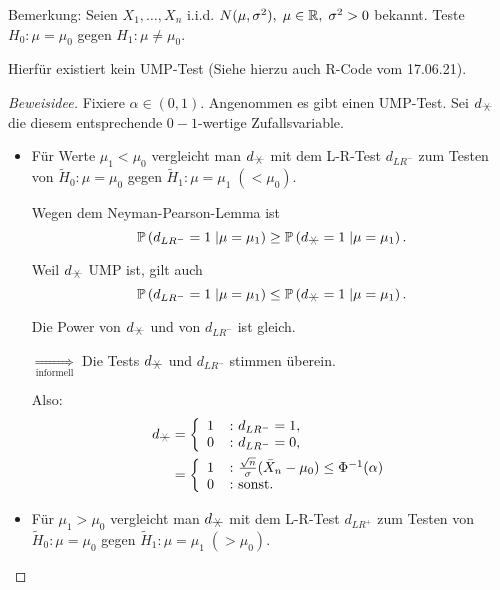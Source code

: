 \documentclass{tstextbook}
\begin{document}
\begin{remark}
	Bemerkung: Seien $ X_1,\ldots,X_n $ i.i.d. $ N(\mu,\sigma^2), \; \mu\in\mathbb R , \; \sigma^2>0 $ bekannt. Teste $ H_0\colon \mu=\mu_0 $ gegen $ H_1\colon \mu\ne\mu_0 $.
	
	Hierfür existiert kein UMP-Test (Siehe hierzu auch R-Code vom 17.06.21).
\end{remark}

\begin{proof}[Beweisidee]
	Fixiere $ \alpha\in(0,1) $. Angenommen es gibt einen UMP-Test. Sei $ d_{\hexstar} $ die diesem entsprechende $ 0-1 $-wertige Zufallsvariable.
	
	\begin{itemize}
		\item Für Werte $ \mu_1<\mu_0 $ vergleicht man $ d_{\hexstar} $ mit dem L-R-Test $ d_{LR^-} $ zum Testen von $ \tilde{H}_0\colon \mu=\mu_0 $ gegen $ \tilde{H}_1\colon \mu=\mu_1 \;(<\mu_0) $. 
		
		Wegen dem Neyman-Pearson-Lemma ist 
		\[
		\Prob\left(d_{LR^-}=1\; |\mu=\mu_1\right) \ge \Prob\left(d_{\hexstar}=1\; |\mu=\mu_1\right).
		\]
		
		Weil $ d_{\hexstar} $ UMP ist, gilt auch 
		\[
		\Prob\left(d_{LR^-}=1\; |\mu=\mu_1\right) \le \Prob\left(d_{\hexstar}=1\; |\mu=\mu_1\right).
		\]
		
		Die Power von $ d_{\hexstar} $ und von $ d_{LR^-} $ ist gleich. 
		
		$ \underset{\text{informell}}{\Rightarrow} $ Die Tests $ d_{\hexstar} $ und $ d_{LR^-} $ stimmen überein.
		
		Also: 
		\[
		\begin{aligned}
			d_{\hexstar} & = \left\{\begin{array}{ll}
				1 & \colon d_{LR^-}=1, \\
				0 & \colon d_{LR^-}=0,
			\end{array}\right. \\
			& = \left\{\begin{array}{ll}
				1 & \colon \frac{\sqrt{n}}{\sigma}(\bar{X}_n-\mu_0)\le\Phi^{-1}(\alpha) \\
				0 & \colon \text{sonst}.
			\end{array}\right.
		\end{aligned}
		\]
		
		\item Für $ \mu_1>\mu_0 $ vergleicht man $ d_{\hexstar} $ mit dem L-R-Test $ d_{LR^+} $ zum Testen von $ \tilde{H}_0\colon \mu=\mu_0 $ gegen $ \tilde{H}_1\colon \mu=\mu_1 \; (>\mu_0) $. 
		

\end{itemize}
\end{proof}
\end{document}
